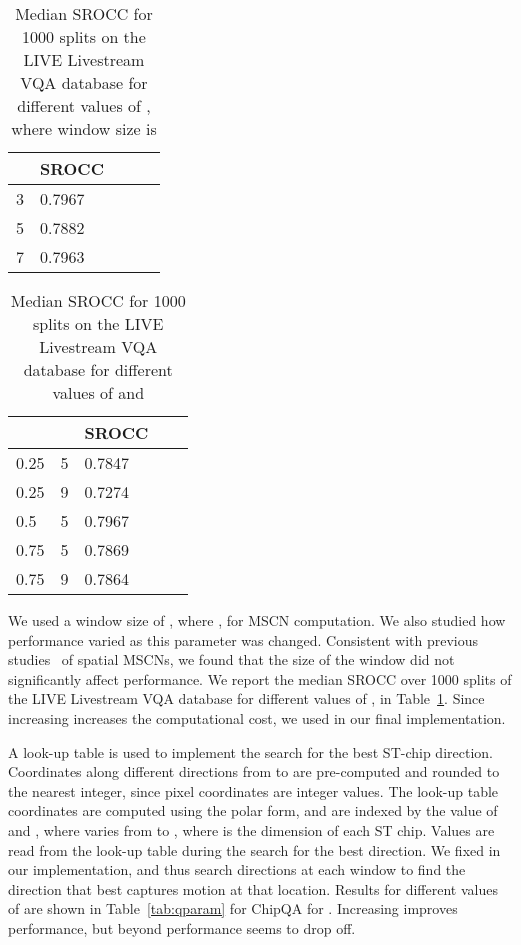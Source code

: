 \documentclass[journal]{IEEEtran}
\begin{document}
\begin{table}
\caption{Median SROCC for 1000 splits on the LIVE Livestream VQA database for different values of , where window size is } 
\begin{center} 
\begin{tabular}{|l|l|l|l|l|}
\hline
  & SROCC \\
\hline
3 &  0.7967\\
\hline
5 & 0.7882 \\
\hline
7 &  0.7963 \\
\hline
\end{tabular}
\label{tab:kl}
\end{center}
\vspace{-5mm}
\end{table}

\begin{table}
\caption{Median SROCC for 1000 splits on the LIVE Livestream VQA database for different values of  and } 
\begin{center} 
\begin{tabular}{|l|l|l|l|l|}
\hline
  &  & SROCC \\
\hline
0.25 & 5 & 0.7847 \\
\hline
0.25 & 9 & 0.7274 \\
\hline
0.5 & 5 & 0.7967 \\
\hline
0.75 & 5 & 0.7869  \\
\hline
0.75 & 9 & 0.7864 \\
\hline
\end{tabular}
\label{tab:atparameters}
\end{center}
\vspace{-5mm}
\end{table}
We used a window size of , where , for MSCN computation. We also studied how performance varied as this parameter was changed. Consistent with previous studies~\cite{brisque} of spatial MSCNs, we found that the size of the window did not significantly affect performance. We report the median SROCC over 1000 splits of the LIVE Livestream VQA database for different values of , in Table~\ref{tab:kl}. Since increasing  increases the computational cost, we used  in our final implementation.  \par
A look-up table is used to implement the search for the best ST-chip direction. Coordinates along different directions from  to  are pre-computed and rounded to the nearest integer, since pixel coordinates are integer values. The look-up table coordinates are computed using the polar form, and are indexed by the value of  and , where  varies from  to , where  is the dimension of each ST chip. Values are read from the look-up table during the search for the best direction. We fixed  in our implementation, and thus search  directions at each  window to find the direction that best captures motion at that location. Results for different values of  are shown in Table~\ref{tab:qparam} for ChipQA for . Increasing  improves performance, but beyond  performance seems to drop off.  \par
\end{document}
